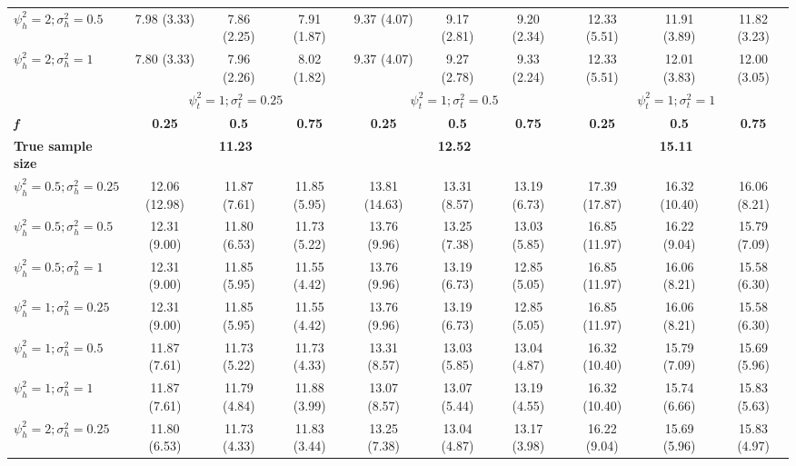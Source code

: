 \documentclass[11pt]{article}
\begin{document}
\begin{landscape}
\begin{table}[]
{\begin{tabular}{l c c c c c c c c c}
          $\psi_h^2 = 2; \sigma_h^2 = 0.5$ & 7.98 (3.33) & 7.86 (2.25) & 7.91 (1.87) & 9.37 (4.07) & 9.17 (2.81) &  9.20 (2.34) & 12.33 (5.51) & 11.91 (3.89) & 11.82 (3.23) \\
          $\psi_h^2 = 2; \sigma_h^2 = 1$ & 7.80 (3.33) & 7.96 (2.26) & 8.02 (1.82) & 9.37 (4.07) & 9.27 (2.78) & 9.33 (2.24) & 12.33 (5.51) & 12.01 (3.83) & 12.00 (3.05) \\
          \hline 
          & \multicolumn{3}{c}{$\psi_t^2 = 1; \sigma_t^2 = 0.25$} & \multicolumn{3}{c}{$\psi_t^2 = 1; \sigma_t^2 = 0.5$} & \multicolumn{3}{c}{$\psi_t^2= 1; \sigma_t^2= 1$} \\
          \cline{2-10}
          \textbf{\textit{f}} & \textbf{0.25} & \textbf{0.5} & \textbf{0.75} & \textbf{0.25} & \textbf{0.5} & \textbf{0.75} & \textbf{0.25} & \textbf{0.5} & \textbf{0.75} \\
          \hline
          \textbf{True sample size} & \multicolumn{3}{c}{\textbf{11.23}} & \multicolumn{3}{c}{\textbf{12.52}} & \multicolumn{3}{c}{\textbf{15.11}} \\
          $\psi_h^2 = 0.5; \sigma_h^2 = 0.25$ & 12.06 (12.98) & 11.87 (7.61) & 11.85 (5.95) & 13.81 (14.63) & 13.31 (8.57) & 13.19 (6.73) & 17.39 (17.87) & 16.32 (10.40) & 16.06 (8.21) \\
          $\psi_h^2 = 0.5; \sigma_h^2 = 0.5$ &  12.31 (9.00) & 11.80 (6.53) & 11.73 (5.22) & 13.76 (9.96) & 13.25 (7.38) & 13.03 (5.85) & 16.85 (11.97) & 16.22 (9.04) & 15.79 (7.09) \\
          $\psi_h^2 = 0.5; \sigma_h^2 = 1$ & 12.31 (9.00) & 11.85 (5.95) & 11.55 (4.42) & 13.76 (9.96) & 13.19 (6.73) & 12.85 (5.05) & 16.85 (11.97) & 16.06 (8.21) & 15.58 (6.30) \\
          $\psi_h^2 = 1; \sigma_h^2 = 0.25$ & 12.31 (9.00) & 11.85 (5.95) & 11.55 (4.42) & 13.76 (9.96) & 13.19 (6.73) & 12.85 (5.05) & 16.85 (11.97) & 16.06 (8.21) & 15.58 (6.30) \\
          $\psi_h^2 = 1; \sigma_h^2 = 0.5$ & 11.87 (7.61) & 11.73 (5.22) & 11.73 (4.33) & 13.31 (8.57) & 13.03 (5.85) & 13.04 (4.87) & 16.32 (10.40) & 15.79 (7.09) & 15.69 (5.96) \\
          $\psi_h^2 = 1; \sigma_h^2 = 1$ &  11.87 (7.61) & 11.79 (4.84) & 11.88 (3.99) & 13.07 (8.57) & 13.07 (5.44) & 13.19 (4.55) & 16.32 (10.40) & 15.74 (6.66) & 15.83 (5.63) \\
          $\psi_h^2 = 2; \sigma_h^2 = 0.25$ & 11.80 (6.53) & 11.73 (4.33) & 11.83 (3.44) & 13.25 (7.38) & 13.04 (4.87) & 13.17 (3.98) & 16.22 (9.04) & 15.69 (5.96) & 15.83 (4.97) \\

\end{tabular}}
\end{table}
\end{landscape}
\end{document}
